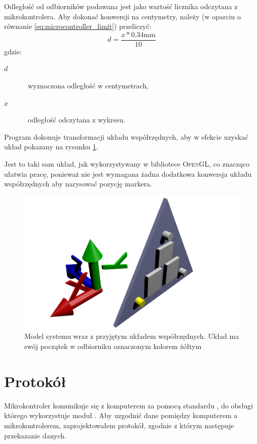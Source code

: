 Odległość od odbiorników podawana jest jako wartość licznika odczytana z mikrokontrolera. Aby dokonać konwersji na centymetry, należy (w oparciu o równanie \ref{eq:microcontroller_limit}) przeliczyć:
\begin{equation}
 d = \frac{x * 0.34\textrm{mm}}{10}
\end{equation}
gdzie:
\begin{description}
 \item[$d$] \ppauza~wyznaczona odległość w centymetrach,
 \item[$x$] \ppauza~odległość odczytana z wykresu.
\end{description}

Program dokonuje transformacji układu współrzędnych, aby w efekcie uzyskać układ pokazany na rysunku \ref{fig:coordinate_system}.

Jest to taki sam układ, jak wykorzystywany w bibliotece \textsc{OpenGL}, co znacząco ułatwia pracę, ponieważ nie jest wymagana żadna dodatkowa konwersja układu współrzędnych aby narysować pozycję markera.

\begin{figure}
 \includegraphics[width=\textwidth]{gfx/uklad_render.png}
 \caption[Model systemu i przyjęty układ współrzędnych]{Model systemu wraz z przyjętym układem współrzędnych. Układ ma swój początek w odbiorniku oznaczonym kolorem żółtym}
 \label{fig:coordinate_system}
\end{figure}

\section{Protokół}
Mikrokontroler komunikuje się z komputerem za pomocą standardu , do obsługi którego wykorzystuje moduł . Aby uzgodnić dane pomiędzy komputerem a mikrokontrolerem, zaprojektowałem protokół, zgodnie z którym następuje przekazanie danych.

